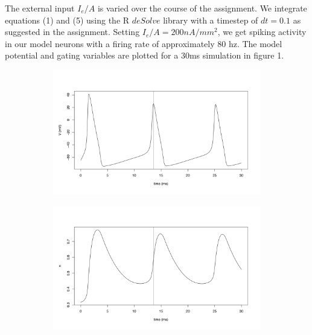 \documentclass{article}
\begin{document}
The external input $I_e/A$ is varied over the course of the assignment. We integrate equations (1) and (5) using the R $deSolve$ library with a timestep of $dt=0.1$ as suggested in the assignment. Setting $I_e/A = 200 nA/mm^2$, we get spiking activity in our model neurons with a firing rate of approximately 80 hz. The model potential and gating variables are plotted for a 30ms simulation in figure 1.

\begin{figure}[h]
	\centering
	\begin{subfigure}[t]{0.45\linewidth}
		\centering
		\includegraphics[width = 1.0\linewidth, trim={20 60 40 70}, clip=true]{hh_V.png}
		\label{fig:hhV}	
	\end{subfigure}%
	\hspace{0.05\linewidth}
	\begin{subfigure}[t]{0.45\linewidth}
		\centering
		\includegraphics[width = 1.0\linewidth, trim={20 60 40 70}, clip=true]{hh_n.png}

\end{subfigure}
\end{figure}
\end{document}
